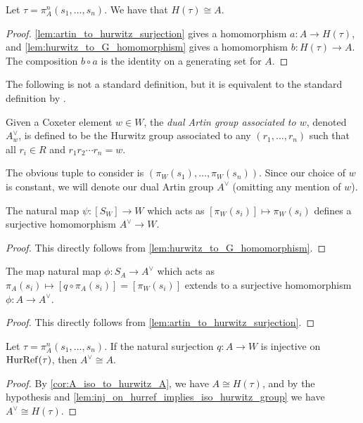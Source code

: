\begin{corollary}
	\label{cor:A_iso_to_hurwitz_A}
	Let $\tau = \pi_A^n(s_1,\ldots,s_n)$.
	We have that $H(\tau) \cong A$.
\end{corollary}
\begin{proof}
	\cref{lem:artin_to_hurwitz_surjection} gives a homomorphism $a \colon A \to H(\tau)$, and \cref{lem:hurwitz_to_G_homomorphism} gives a homomorphism $b \colon H(\tau) \to A$.
	The composition $b \circ a$ is the identity on a generating set for $A$.
\end{proof}

The following is not a standard definition, but it is equivalent to the standard definition by \cite[Lemma 7.11]{bessis_topology_2004}.
\begin{definition}
	Given a Coxeter element $w \in W$, the \emph{dual Artin group associated to  $w$}, denoted $A^\vee_w$, is defined to be the Hurwitz group associated to any $(r_1,\ldots,r_n)$ such that all $r_i \in R$ and  $r_1r_2\cdots r_n=w$.
\end{definition}
The obvious tuple to consider is $(\pi_W(s_1),\ldots,\pi_W(s_n))$.
Since our choice of $w$ is constant, we will denote our dual Artin group  $A^\vee$ (omitting any mention of  $w$).

\begin{corollary}
	\label{cor:surj_dual_artin_to_W}
	The natural map $\psi \colon [S_W] \to W$ which acts as  $[\pi_W(s_i)] \mapsto \pi_W(s_i)$ defines a surjective homomorphism $A^\vee \to W$.
\end{corollary}
\begin{proof}
	This directly follows from \cref{lem:hurwitz_to_G_homomorphism}.
\end{proof}

\begin{corollary}
	\label{cor:surj_artin_to_dual_artin}
	The map natural map $\phi \colon S_A \to A^\vee $ which acts as $\pi_A(s_i) \mapsto [q \circ \pi_A(s_i)] = [\pi_W(s_i)]$ extends to a surjective homomorphism $\phi \colon A \to A^\vee$.
\end{corollary}
\begin{proof}
	This directly follows from \cref{lem:artin_to_hurwitz_surjection}.
\end{proof}

\begin{theorem}
	\label{thm:proj_inj_on_Q_implies_dual_isomorphism}
	Let $\tau = \pi^n_A(s_1,\ldots,s_n)$.
	If the natural surjection $q \colon A \to W$ is injective on  $\operatorname{HurRef}(\tau)$, then $A^\vee \cong A$.
\end{theorem}
\begin{proof}
	By \cref{cor:A_iso_to_hurwitz_A}, we have $A \cong H(\tau)$, and by the hypothesis and \cref{lem:inj_on_hurref_implies_iso_hurwitz_group} we have $A^\vee \cong H(\tau)$.
\end{proof}


